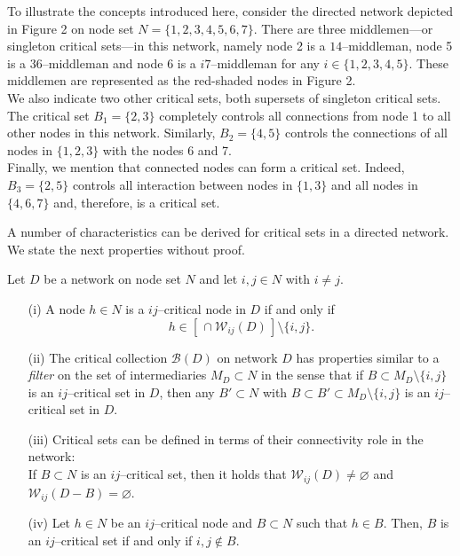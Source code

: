 \begin{example} \label{ex:Figure1}
To illustrate the concepts introduced here, consider the directed network depicted in Figure 2 on node set $N = \{ 1,2,3,4,5,6,7 \}$. There are three middlemen---or singleton critical sets---in this network, namely node 2 is a $14$--middleman, node 5 is a $36$--middleman and node 6 is a $i7$--middleman for any $i \in \{ 1,2,3,4,5 \}$. These middlemen are represented as the red-shaded nodes in Figure 2.
\\
We also indicate two other critical sets, both supersets of singleton critical sets. The critical set $B_1 = \{ 2,3 \}$ completely controls all connections from node 1 to all other nodes in this network. Similarly, $B_2 = \{ 4,5 \}$ controls the connections of all nodes in $\{ 1,2,3 \}$ with the nodes 6 and 7.
\\
Finally, we mention that connected nodes can form a critical set. Indeed, $B_3 = \{ 2,5 \}$ controls all interaction between nodes in $\{1,3 \}$ and all nodes in $\{ 4,6,7 \}$ and, therefore, is a critical set.
\end{example}
A number of characteristics can be derived for critical sets in a directed network. We state the next properties without proof.
\begin{property} \label{prop:blocks}
Let $D$ be a network on node set $N$ and let $i,j \in N$ with $i \neq j$.
\begin{itemize}
\item[(i)] A node $h \in N$ is a $ij$--critical node in $D$ if and only if
\[
h \in \left[ \, \cap \mathcal{W}_{ij} (D) \, \right] \setminus \{i,j\} .
\]

\item[(ii)] The critical collection $\mathcal{B} (D)$ on network $D$ has properties similar to a \emph{filter} on the set of intermediaries $M_D \subset N$ in the sense that if $B \subset M_D \setminus \{ i,j \}$ is an $ij$--critical set in $D$, then any $B' \subset N$ with $B \subset B' \subset M_D \setminus \{ i,j \}$ is an $ij$--critical set in $D$.

\item[(iii)] Critical sets can be defined in terms of their connectivity role in the network:
\\
If $B \subset N$ is an $ij$--critical set, then it holds that $\mathcal{W}_{ij}(D) \neq \varnothing$ and $\mathcal{W}_{ij}(D - B) = \varnothing$.

\item[(iv)] Let $h \in N$ be an $ij$--critical node and $B \subset N$ such that $h \in B$. Then, $B$ is an $ij$--critical set if and only if $i,j \notin B$.
\end{itemize}
\end{property}
